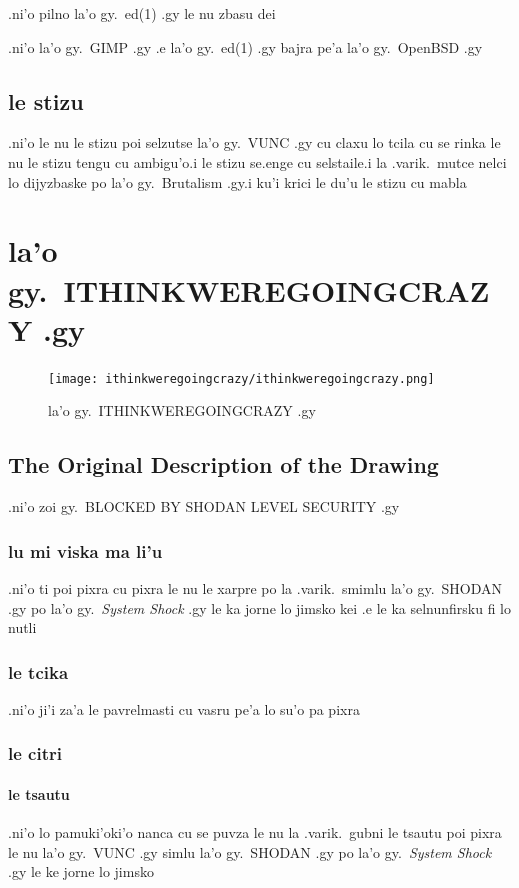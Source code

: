 \documentclass{report}
\begin{document}
.ni'o pilno la'o gy.\ ed(1) .gy le nu zbasu dei

.ni'o la'o gy.\ GIMP .gy .e la'o gy.\ ed(1) .gy bajra pe'a la'o gy.\ OpenBSD .gy

\section{le stizu}
.ni'o le nu le stizu poi selzutse la'o gy.\ VUNC .gy cu claxu lo tcila cu se rinka le nu le stizu tengu cu ambigu'o\@  .i le stizu se.enge cu selstaile\@  .i la .varik.\ mutce nelci lo dijyzbaske po la'o gy.\ Brutalism .gy\@  .i ku'i krici le du'u le stizu cu mabla

\chapter{la'o gy.\ ITHINKWEREGOINGCRAZY .gy}
\begin{figure}[ht]
	\centering
	\texttt{[image: ithinkweregoingcrazy/ithinkweregoingcrazy.png]}
	\caption[center]{la'o gy.\ ITHINKWEREGOINGCRAZY .gy}
\end{figure}
\section{The Original Description of the Drawing}
.ni'o zoi gy.\ BLOCKED BY SHODAN LEVEL SECURITY .gy

\subsection{lu mi viska ma li'u}
.ni'o ti poi pixra cu pixra le nu le xarpre po la .varik.\ smimlu la'o gy.\ SHODAN .gy po la'o gy.\ \textit{System Shock} .gy le ka jorne lo jimsko kei .e le ka selnunfirsku fi lo nutli

\subsection{le tcika}
.ni'o ji'i za'a le pavrelmasti cu vasru pe'a lo su'o pa pixra

\subsection{le citri}
\subsubsection{le tsautu}
.ni'o lo pamuki'oki'o nanca cu se puvza le nu la .varik.\ gubni le tsautu poi pixra le nu la'o gy.\ VUNC .gy simlu la'o gy.\ SHODAN .gy po la'o gy.\ \textit{System Shock} .gy le ke jorne lo jimsko
\end{document}
